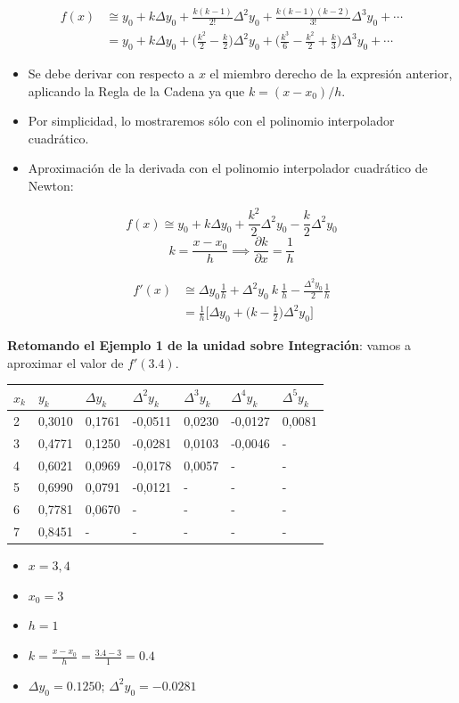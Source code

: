 \documentclass[openany]{book}
\providecommand{\tightlist}{%
  \setlength{\itemsep}{0pt}\setlength{\parskip}{0pt}}
\begin{document}
\[
\begin{aligned}
f(x) & \cong y_0 + k \Delta y_0 + \frac{k(k-1)}{2!}\Delta^2 y_0 + \frac{k(k-1)(k-2)}{3!}\Delta^3 y_0 + \cdots \\
&= y_0 + k \Delta y_0 + \Big( \frac{k^2}{2} - \frac{k}{2} \Big) \Delta^2 y_0 + \Big( \frac{k^3}{6} - \frac{k^2}{2} + \frac{k}{3} \Big) \Delta^3 y_0  + \cdots
\end{aligned}
\]

\begin{itemize}
\tightlist
\item
  Se debe derivar con respecto a \(x\) el miembro derecho de la expresión anterior, aplicando la Regla de la Cadena ya que \(k = (x - x_0)/h\).
\item
  Por simplicidad, lo mostraremos sólo con el polinomio interpolador cuadrático.
\item
  Aproximación de la derivada con el polinomio interpolador cuadrático de Newton:
\end{itemize}

\[
f(x)  \cong y_0 + k \Delta y_0 + \frac{k^2}{2} \Delta^2 y_0 - \frac{k}{2} \Delta^2 y_0
\]
\[
k = \frac{x-x_0}{h} \implies \frac{\partial k}{\partial x} = \frac{1}{h}
\]

\[
\begin{aligned}
f'(x) & \cong \Delta y_0 \frac{1}{h} + \Delta^2 y_0 ~k~ \frac{1}{h} - \frac{\Delta^2 y_0}{2} \frac{1}{h} \\
& = \frac{1}{h} \Big[ \Delta y_0 + \Big( k-\frac{1}{2} \Big) \Delta^2 y_0 \Big]
\end{aligned}
\]

\textbf{Retomando el Ejemplo 1 de la unidad sobre Integración}: vamos a aproximar el valor de \(f'(3.4)\).

\begin{longtable}[]{@{}lllllll@{}}
\toprule
\(x_k\) & \(y_k\) & \(\Delta y_k\) & \(\Delta^2 y_k\) & \(\Delta^3 y_k\) & \(\Delta^4 y_k\) & \(\Delta^5 y_k\)\tabularnewline
\midrule
\endhead
2 & 0,3010 & 0,1761 & -0,0511 & 0,0230 & -0,0127 & 0,0081\tabularnewline
3 & 0,4771 & 0,1250 & -0,0281 & 0,0103 & -0,0046 & -\tabularnewline
4 & 0,6021 & 0,0969 & -0,0178 & 0,0057 & - & -\tabularnewline
5 & 0,6990 & 0,0791 & -0,0121 & - & - & -\tabularnewline
6 & 0,7781 & 0,0670 & - & - & - & -\tabularnewline
7 & 0,8451 & - & - & - & - & -\tabularnewline
\bottomrule
\end{longtable}

\begin{itemize}
    \small
    \item $x = 3,4$
    \item $x_0 = 3$
    \item $h = 1$
    \item $k = \frac{x-x_0}{h} = \frac{3.4-3}{1} = 0.4$
    \item $\Delta y_0 = 0.1250$; $\Delta^2 y_0 = -0.0281$
\end{itemize}
\end{document}
